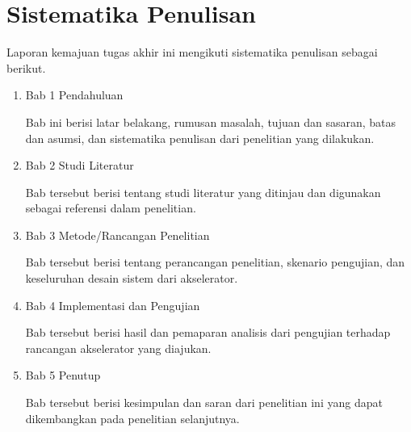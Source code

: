 \section{Sistematika Penulisan}

Laporan kemajuan tugas akhir ini mengikuti sistematika penulisan sebagai berikut.

\begin{enumerate}
	\item Bab 1 Pendahuluan

	      Bab ini berisi latar belakang, rumusan masalah, tujuan dan sasaran, batas dan asumsi, dan sistematika penulisan dari penelitian yang dilakukan.

	\item Bab 2 Studi Literatur

	      Bab tersebut berisi tentang studi literatur yang ditinjau dan digunakan sebagai referensi dalam penelitian.

	\item Bab 3 Metode/Rancangan Penelitian

	      Bab tersebut berisi tentang perancangan penelitian, skenario pengujian, dan keseluruhan desain sistem dari akselerator.

	\item Bab 4 Implementasi dan Pengujian

	      Bab tersebut berisi hasil dan pemaparan analisis dari pengujian terhadap rancangan akselerator yang diajukan.

	\item Bab 5 Penutup

	      Bab tersebut berisi kesimpulan dan saran dari penelitian ini yang dapat dikembangkan pada penelitian selanjutnya.
\end{enumerate}
